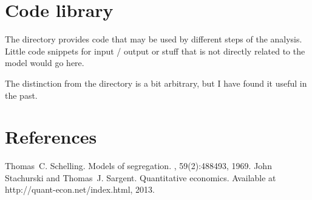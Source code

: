 \documentclass[a4paper,11pt,english]{sphinxmanual}
\begin{document}
\chapter{Code library}
\label{\detokenize{library:code-library}}\label{\detokenize{library:library}}\label{\detokenize{library::doc}}
The directory  provides code that may be used by different steps of the analysis. Little code snippets for input / output or stuff that is not directly related to the model would go here.

The distinction from the {\hyperref[\detokenize{model_code:model-code}]{}} directory is a bit arbitrary, but I have found it useful in the past.


\chapter{References}
\label{\detokenize{references:references}}\label{\detokenize{references:id1}}\label{\detokenize{references::doc}}


\begin{sphinxthebibliography}{1}
Thomas C. Schelling. Models of segregation. , 59(2):488\textendash{}493, 1969.
John Stachurski and Thomas J. Sargent. Quantitative economics. Available at http://quant-econ.net/index.html, 2013.
\end{sphinxthebibliography}


\renewcommand{\indexname}{Python Module Index}
\begin{sphinxtheindex}
\let\bigletter\sphinxstyleindexlettergroup
\bigletter{a}
\item\relax{}
\indexspace
\bigletter{b}
\item\relax{}
\indexspace
\bigletter{f}
\item\relax{}
\indexspace
\bigletter{m}
\item\relax{}
\end{sphinxtheindex}

\renewcommand{\indexname}{Index}
\printindex
\end{document}
